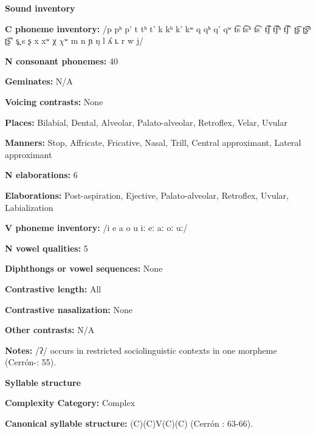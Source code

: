 \textbf{Sound inventory}



\textbf{C phoneme inventory:} /p pʰ p’ t tʰ t’ k kʰ k’ kʷ q qʰ q’ qʷ t͡s t͡sʰ t͡s’ t͡ʃ t͡ʃʰ t͡ʃ’ ʈ͡ʂ ʈ͡ʂʰ ʈ͡ʂ’ s̪ s ʂ x xʷ χ $\chi ʷ$ m n ɲ ŋ l ʎ ʟ r w j/



\textbf{N consonant phonemes:} 40



\textbf{Geminates:} N/A



\textbf{Voicing contrasts:} None



\textbf{Places:} Bilabial, Dental, Alveolar, Palato-alveolar, Retroflex, Velar, Uvular



\textbf{Manners:} Stop, Affricate, Fricative, Nasal, Trill, Central approximant, Lateral approximant



\textbf{N elaborations:} 6



\textbf{Elaborations:} Post-aspiration, Ejective, Palato-alveolar, Retroflex, Uvular, Labialization



\textbf{V phoneme inventory:} /i e a o u iː eː aː oː uː/



\textbf{N vowel qualities:} 5



\textbf{Diphthongs or vowel sequences:} None



\textbf{Contrastive length:} All



\textbf{Contrastive nasalization:} None



\textbf{Other contrasts:} N/A



\textbf{Notes:} /ʔ/ occurs in restricted sociolinguistic contexts in one morpheme (Cerrón-\citealt{Palomino2006}: 55).



\textbf{Syllable structure}



\textbf{Complexity Category:} Complex



\textbf{Canonical syllable structure:} (C)(C)V(C)(C) (Cerrón \citealt{Palomino2006}: 63-66).



